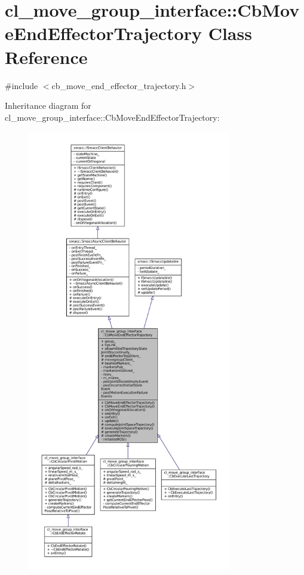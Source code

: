 \hypertarget{classcl__move__group__interface_1_1CbMoveEndEffectorTrajectory}{}\section{cl\+\_\+move\+\_\+group\+\_\+interface\+:\+:Cb\+Move\+End\+Effector\+Trajectory Class Reference}
\label{classcl__move__group__interface_1_1CbMoveEndEffectorTrajectory}


{\ttfamily \#include $<$cb\+\_\+move\+\_\+end\+\_\+effector\+\_\+trajectory.\+h$>$}



Inheritance diagram for cl\+\_\+move\+\_\+group\+\_\+interface\+:\+:Cb\+Move\+End\+Effector\+Trajectory\+:
\nopagebreak
\begin{figure}[H]
\begin{center}
\leavevmode
\includegraphics[height=550pt]{classcl__move__group__interface_1_1CbMoveEndEffectorTrajectory__inherit__graph}
\end{center}
\end{figure}


